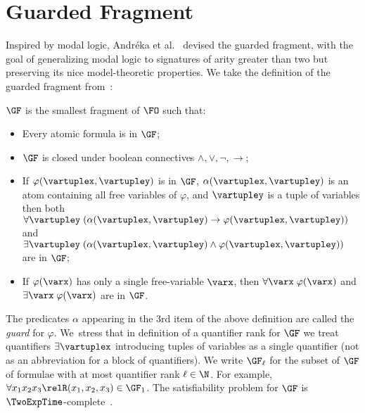 \section{Guarded Fragment}
Inspired by modal logic, Andréka et al.~\cite{AndrekaNB98} devised the guarded fragment, with the goal of generalizing modal logic to signatures of arity greater than two but preserving its nice model-theoretic properties.
We take the definition of the guarded fragment from~\cite{BednarczykJ22}:
\begin{definition}
  $\GF$ is the smallest fragment of $\FO$  such that:
  \begin{itemize}\itemsep0em
      \item Every atomic formula is in $\GF$;
      \item $\GF$ is closed under boolean connectives $\land, \lor, \neg, \to$;
      \item If $\varphi(\vartuplex, \vartupley)$ is in $\GF$, $\alpha(\vartuplex, \vartupley)$ is an atom containing all free variables of $\varphi$, and $\vartupley$ is a tuple of variables then both $\forall{\vartupley} \; (\alpha(\vartuplex, \vartupley) \to \varphi(\vartuplex, \vartupley))$ and $\exists{\vartupley} \; (\alpha(\vartuplex, \vartupley) \land \varphi(\vartuplex, \vartupley))$ are in $\GF$;
      \item If $\varphi(\varx)$ has only a single free-variable $\varx$, then $\forall{\varx}\; \varphi(\varx)$ and $\exists{\varx}\; \varphi(\varx)$ are in $\GF$.
  \end{itemize}
\end{definition}
The predicates $\alpha$ appearing in the 3rd item of the above definition are called the \emph{guard} for $\varphi$.
We~stress that in definition of a quantifier rank for $\GF$ we treat quantifiers $\exists{\vartuplex}$ introducing tuples of variables as a single quantifier (not as an abbreviation for a block of quantifiers).
We write $\GF_{\ell}$ for the subset of $\GF$ of formulae with at most quantifier rank $\ell \in \N$.
For example, $\forall{x_{1}x_{2}x_{3}} \relR(x_{1}, x_{2}, x_{3}) \in \GF_{1}$.
The satisfiability problem for $\GF$ is $\TwoExpTime$-complete~\cite{gradel1999a}.

